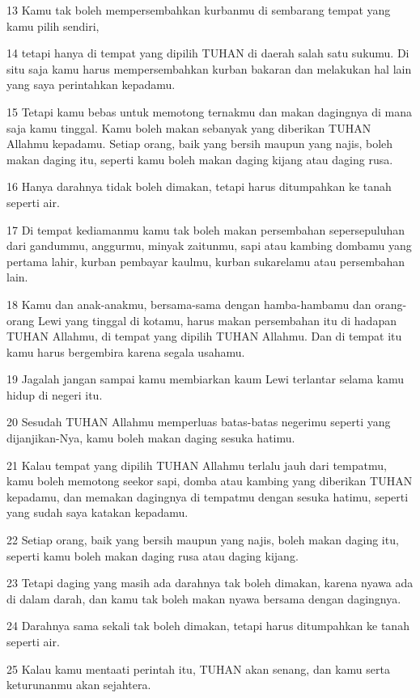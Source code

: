 \par 13 Kamu tak boleh mempersembahkan kurbanmu di sembarang tempat yang kamu pilih sendiri,
\par 14 tetapi hanya di tempat yang dipilih TUHAN di daerah salah satu sukumu. Di situ saja kamu harus mempersembahkan kurban bakaran dan melakukan hal lain yang saya perintahkan kepadamu.
\par 15 Tetapi kamu bebas untuk memotong ternakmu dan makan dagingnya di mana saja kamu tinggal. Kamu boleh makan sebanyak yang diberikan TUHAN Allahmu kepadamu. Setiap orang, baik yang bersih maupun yang najis, boleh makan daging itu, seperti kamu boleh makan daging kijang atau daging rusa.
\par 16 Hanya darahnya tidak boleh dimakan, tetapi harus ditumpahkan ke tanah seperti air.
\par 17 Di tempat kediamanmu kamu tak boleh makan persembahan sepersepuluhan dari gandummu, anggurmu, minyak zaitunmu, sapi atau kambing dombamu yang pertama lahir, kurban pembayar kaulmu, kurban sukarelamu atau persembahan lain.
\par 18 Kamu dan anak-anakmu, bersama-sama dengan hamba-hambamu dan orang-orang Lewi yang tinggal di kotamu, harus makan persembahan itu di hadapan TUHAN Allahmu, di tempat yang dipilih TUHAN Allahmu. Dan di tempat itu kamu harus bergembira karena segala usahamu.
\par 19 Jagalah jangan sampai kamu membiarkan kaum Lewi terlantar selama kamu hidup di negeri itu.
\par 20 Sesudah TUHAN Allahmu memperluas batas-batas negerimu seperti yang dijanjikan-Nya, kamu boleh makan daging sesuka hatimu.
\par 21 Kalau tempat yang dipilih TUHAN Allahmu terlalu jauh dari tempatmu, kamu boleh memotong seekor sapi, domba atau kambing yang diberikan TUHAN kepadamu, dan memakan dagingnya di tempatmu dengan sesuka hatimu, seperti yang sudah saya katakan kepadamu.
\par 22 Setiap orang, baik yang bersih maupun yang najis, boleh makan daging itu, seperti kamu boleh makan daging rusa atau daging kijang.
\par 23 Tetapi daging yang masih ada darahnya tak boleh dimakan, karena nyawa ada di dalam darah, dan kamu tak boleh makan nyawa bersama dengan dagingnya.
\par 24 Darahnya sama sekali tak boleh dimakan, tetapi harus ditumpahkan ke tanah seperti air.
\par 25 Kalau kamu mentaati perintah itu, TUHAN akan senang, dan kamu serta keturunanmu akan sejahtera.

